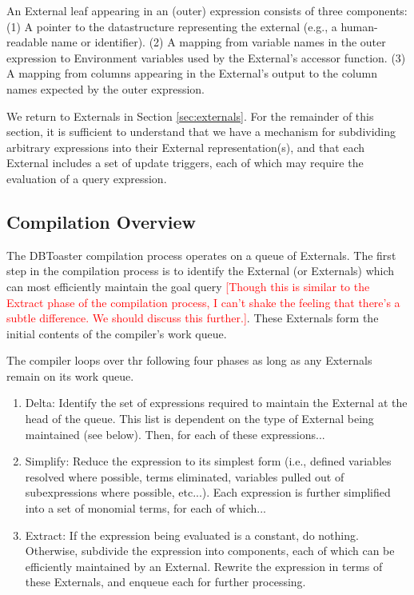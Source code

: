 \documentclass[11pt]{amsart}
\newcommand{\todo}[1]{\textcolor{red}{[#1]}}
\begin{document}
An External leaf appearing in an (outer) expression consists of three components: (1) A pointer to the datastructure representing the external (e.g., a human-readable name or identifier).  (2) A mapping from variable names in the outer expression to Environment variables used by the External's accessor function.  (3) A mapping from columns appearing in the External's output to the column names expected by the outer expression.

We return to Externals in Section \ref{sec:externals}.  For the remainder of this section, it is sufficient to understand that we have a mechanism for subdividing arbitrary expressions into their External representation(s), and that each External includes a set of update triggers, each of which may require the evaluation of a query expression.

\subsection{Compilation Overview}
The DBToaster compilation process operates on a queue of  Externals.  The first step in the compilation process is to identify the External (or Externals) which can most efficiently maintain the goal query \todo{Though this is similar to the Extract phase of the compilation process, I can't shake the feeling that there's a subtle difference.  We should discuss this further.}.  These Externals form the initial contents of the compiler's work queue.

The compiler loops over thr following four phases as long as any Externals remain on its work queue.
\begin{enumerate} 
\item Delta: Identify the set of expressions required to maintain the External at the head of the queue.  This list is dependent on the type of External being maintained (see below).  Then, for each of these expressions...
\item Simplify: Reduce the expression to its simplest form (i.e., defined variables resolved where possible, terms eliminated, variables pulled out of subexpressions where possible, etc...).  Each expression is further simplified into a set of monomial terms, for each of which...
\item Extract: If the expression being evaluated is a constant, do nothing.  Otherwise, subdivide the expression into components, each of which can be efficiently maintained by an External.  Rewrite the expression in terms of these Externals, and enqueue each for further processing. 
\end{enumerate}
\end{document}
